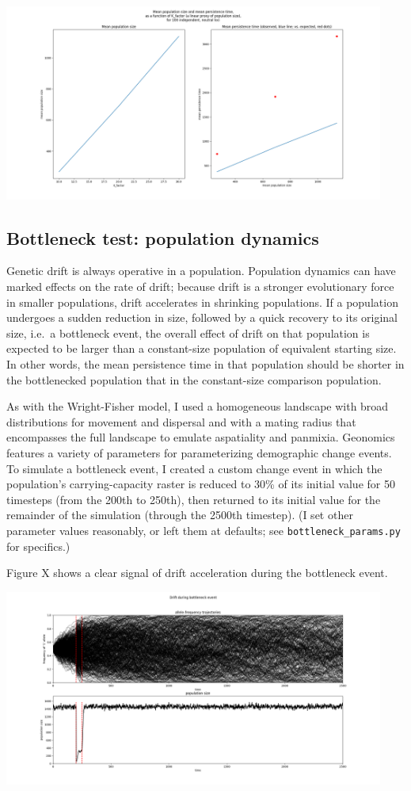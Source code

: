 ﻿\documentclass{article}
\begin{document}
\includegraphics[width=125mm]{./img/validation/wf/pop_size_vs_K_factor_and_mean_persist_t_vs_pop_size.png}


\subsection{Bottleneck test: population dynamics}
Genetic drift is always operative in a population. Population dynamics can have
marked effects on the rate of drift; because drift is a stronger evolutionary
force in smaller populations, drift accelerates in shrinking populations. If a
population undergoes a sudden reduction in size, followed by a quick recovery to
its original size, i.e.\ a bottleneck event, the overall effect of drift on
that population is expected to be larger than a constant-size population of equivalent
starting size. In other words, the mean persistence time in that population
should be shorter in the bottlenecked population that in the constant-size comparison
population.

As with the Wright-Fisher model, I used a homogeneous landscape with broad distributions
for movement and dispersal and with a mating radius that encompasses the full landscape
to emulate aspatiality and panmixia. Geonomics features a variety of parameters for
parameterizing demographic change events. To simulate a bottleneck event,
I created a custom change event in which the population's carrying-capacity raster
is reduced to 30\% of its initial value for 50 timesteps (from the 200th to 250th),
then returned to its initial value for the remainder of the simulation
(through the 2500th timestep).
(I set other parameter values reasonably, or left them at defaults;
see \texttt{bottleneck\_params.py} for specifics.)


Figure X shows a clear signal of drift acceleration during the bottleneck event.

\includegraphics[width=125mm]{./img/validation/bottleneck/alleles_seem_to_take_too_long_to_fix.png}
\end{document}
